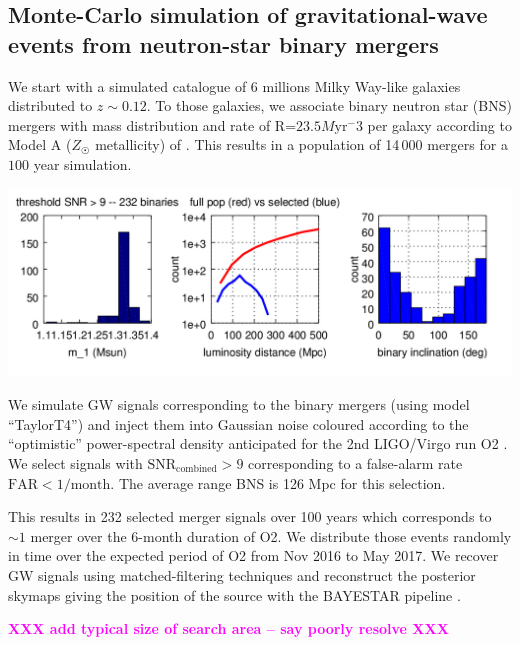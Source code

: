 \documentclass[a0,portrait]{a0poster}
\newcommand{\ECM}[1] {\textbf{\textcolor{magenta}{#1}}}
\begin{document}
\begin{multicols}{2}
\section*{Monte-Carlo simulation of gravitational-wave events from neutron-star binary mergers}

We start with a simulated catalogue of 6 millions Milky Way-like galaxies
distributed to $z\sim 0.12$. To those galaxies, we associate binary neutron star
(BNS) mergers with mass distribution and rate of R=$23.5 M\mathrm{yr}^-3$ per galaxy
according to Model A ($Z_{\astrosun}$ metallicity) of
\cite{dominik12:_doubl_compac_objec}. This results in a population of 14\,000
mergers for a $100$ year simulation.

\begin{center}\vspace{.5cm}
    \includegraphics[width=30cm]{figures/summary_plot.png}
\end{center}

We simulate GW signals corresponding to the binary mergers (using model
``TaylorT4'') and inject them into Gaussian noise coloured according to the
``optimistic'' power-spectral density anticipated for the 2nd LIGO/Virgo run O2
\cite{lrr-2016-1}. We select signals with $\mathrm{SNR}_{\mathrm{combined}} > 9$
corresponding to a false-alarm rate $\mathrm{FAR} < 1/\mathrm{month}$. The average range
BNS is 126 Mpc for this selection.

This results in 232 selected merger signals over 100 years which corresponds to
$\sim 1$ merger over the 6-month duration of O2. We distribute those events randomly in
time over the expected period of O2 from Nov 2016 to May 2017. We
recover GW signals using matched-filtering techniques and reconstruct the
posterior skymaps giving the position of the source with the BAYESTAR pipeline
\cite{PhysRevD.93.024013}.

\ECM{XXX add typical size of search area -- say poorly resolve XXX}




\end{multicols}
\end{document}
